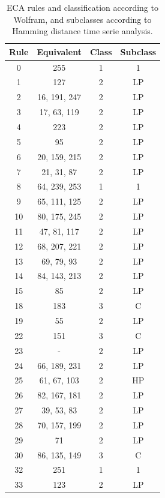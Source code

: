 \setlength{\tabcolsep}{10pt}
\setlength{\tabcolsep}{10pt}
\begin{table}
    \caption{ECA rules and classification according to Wolfram, and subclasses according to Hamming distance time serie analysis.}
    \label{tab:ECAclasses}
    \hskip-4.0cm
    \begin{tabular}{c|c|c|c|}
        
        Rule & Equivalent & Class & Subclass \\
        \hline
        0 & 255 & 1 & 1  \\
        1 & 127 & 2 & LP  \\
        2 & 16, 191, 247 & 2 & LP  \\
        3 & 17, 63, 119 & 2 & LP  \\
        4 & 223 & 2 & LP  \\
        5 & 95 & 2 & LP  \\
        6 & 20, 159, 215 & 2 & LP \\
        7 & 21, 31, 87 & 2 & LP \\
        8 & 64, 239, 253 & 1 & 1 \\
        9 & 65, 111, 125 & 2 & LP \\
        10 & 80, 175, 245  & 2 & LP \\
        11 & 47, 81, 117 & 2 & LP \\
        12 & 68, 207, 221 & 2 & LP \\
        13 & 69, 79, 93 & 2 & LP \\
        14 & 84, 143, 213 & 2 & LP \\
        15 & 85 & 2 & LP \\
        18 & 183 & 3 & C \\
        19 & 55 & 2 & LP \\
        22 & 151 & 3 & C \\
        23 & - & 2 & LP \\
        24 & 66, 189, 231 & 2 & LP \\
        25 & 61, 67, 103 & 2 & HP \\
        26 & 82, 167, 181 & 2 & LP \\
        27 & 39, 53, 83 & 2 & LP \\
        28 & 70, 157, 199 & 2 & LP \\
        29 & 71 & 2 & LP \\
        30 & 86, 135, 149 & 3 & C \\
        32 & 251 & 1 & 1 \\
        33 & 123 & 2 & LP \\

\end{tabular}
\end{table}
